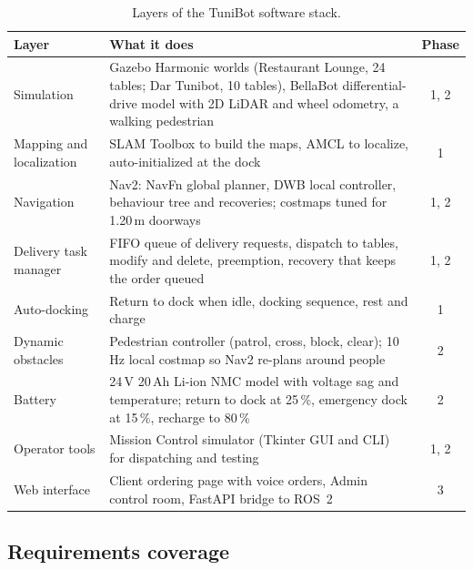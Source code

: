 \documentclass[11pt,a4paper]{article}
\begin{document}
\begin{table}[H]
\centering
\begin{tabularx}{\linewidth}{l L c}
\toprule
\textbf{Layer} & \textbf{What it does} & \textbf{Phase} \\
\midrule
Simulation & Gazebo Harmonic worlds (Restaurant Lounge, 24 tables; Dar Tunibot, 10 tables), BellaBot differential-drive model with 2D LiDAR and wheel odometry, a walking pedestrian & 1, 2 \\
Mapping and localization & SLAM Toolbox to build the maps, AMCL to localize, auto-initialized at the dock & 1 \\
Navigation & Nav2: NavFn global planner, DWB local controller, behaviour tree and recoveries; costmaps tuned for 1.20\,m doorways & 1, 2 \\
Delivery task manager & FIFO queue of delivery requests, dispatch to tables, modify and delete, preemption, recovery that keeps the order queued & 1, 2 \\
Auto-docking & Return to dock when idle, docking sequence, rest and charge & 1 \\
Dynamic obstacles & Pedestrian controller (patrol, cross, block, clear); 10\,Hz local costmap so Nav2 re-plans around people & 2 \\
Battery & 24\,V 20\,Ah Li-ion NMC model with voltage sag and temperature; return to dock at 25\,\%, emergency dock at 15\,\%, recharge to 80\,\% & 2 \\
Operator tools & Mission Control simulator (Tkinter GUI and CLI) for dispatching and testing & 1, 2 \\
Web interface & Client ordering page with voice orders, Admin control room, FastAPI bridge to ROS~2 & 3 \\
\bottomrule
\end{tabularx}
\caption{Layers of the TuniBot software stack.}
\end{table}

\subsection{Requirements coverage}
\end{document}
